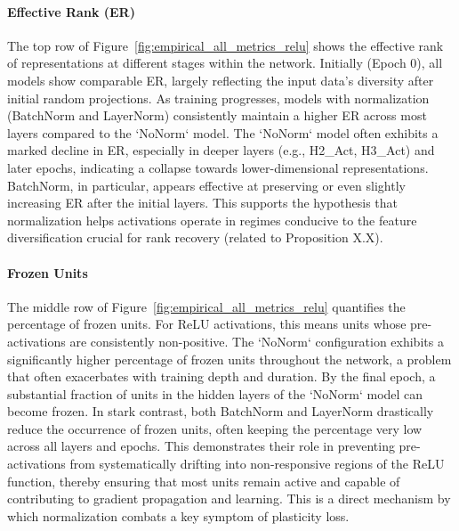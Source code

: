 \paragraph{Effective Rank (ER)}
The top row of Figure~\ref{fig:empirical_all_metrics_relu} shows the effective rank of representations at different stages within the network. Initially (Epoch 0), all models show comparable ER, largely reflecting the input data's diversity after initial random projections. As training progresses, models with normalization (BatchNorm and LayerNorm) consistently maintain a higher ER across most layers compared to the `NoNorm` model. The `NoNorm` model often exhibits a marked decline in ER, especially in deeper layers (e.g., H2\_Act, H3\_Act) and later epochs, indicating a collapse towards lower-dimensional representations. BatchNorm, in particular, appears effective at preserving or even slightly increasing ER after the initial layers. This supports the hypothesis that normalization helps activations operate in regimes conducive to the feature diversification crucial for rank recovery (related to Proposition X.X).

\paragraph{Frozen Units}
The middle row of Figure~\ref{fig:empirical_all_metrics_relu} quantifies the percentage of frozen units. For ReLU activations, this means units whose pre-activations are consistently non-positive. The `NoNorm` configuration exhibits a significantly higher percentage of frozen units throughout the network, a problem that often exacerbates with training depth and duration. By the final epoch, a substantial fraction of units in the hidden layers of the `NoNorm` model can become frozen. In stark contrast, both BatchNorm and LayerNorm drastically reduce the occurrence of frozen units, often keeping the percentage very low across all layers and epochs. This demonstrates their role in preventing pre-activations from systematically drifting into non-responsive regions of the ReLU function, thereby ensuring that most units remain active and capable of contributing to gradient propagation and learning. This is a direct mechanism by which normalization combats a key symptom of plasticity loss.

